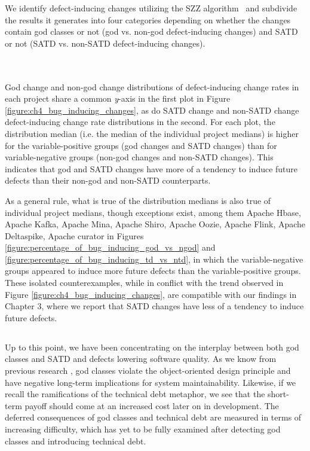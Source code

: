 We identify defect-inducing changes utilizing the SZZ algorithm~\cite{sliwerski-msr-2005} and subdivide the results it generates into four categories depending on whether the changes contain god classes or not (god vs. non-god defect-inducing changes) and SATD or not (SATD vs. non-SATD defect-inducing changes).\\ \\ \\



God change and non-god change distributions of defect-inducing change rates in each project share a common \textit{y}-axis in the first plot in Figure \ref{figure:ch4_bug_inducing_changes}, as do SATD change and non-SATD change defect-inducing change rate distributions in the second. For each plot, the distribution median (i.e. the median of the individual project medians) is higher for the variable-positive groups (god changes and SATD changes) than for variable-negative groups (non-god changes and non-SATD changes). This indicates that god and SATD changes have more of a tendency to induce future defects than their non-god and non-SATD counterparts.

As a general rule, what is true of the distribution medians is also true of individual project medians, though exceptions exist, among them Apache Hbase, Apache Kafka, Apache Mina, Apache Shiro, Apache Oozie, Apache Flink, Apache Deltaspike, Apache curator in Figures \ref{figure:percentage_of_bug_inducing_god_vs_ngod} and \ref{figure:percentage_of_bug_inducing_td_vs_ntd}, in which the variable-negative groups appeared to induce more future defects than the variable-positive groups. These isolated counterexamples, while in conflict with the trend observed in Figure \ref{figure:ch4_bug_inducing_changes}, are compatible with our findings in Chapter 3, where we report that SATD changes have less of a tendency to induce future defects.

\subsection*{\chapterIVrqIII}

Up to this point, we have been concentrating on the interplay between both god classes and SATD and defects lowering software quality. As we know from previous research \cite{marinescu2004detection}, god classes violate the object-oriented design principle and have negative long-term implications for system maintainability. Likewise, if we recall the ramifications of the technical debt metaphor, we see that the short-term payoff should come at an increased cost later on in development. The deferred consequences of god classes and technical debt are measured in terms of increasing difficulty, which has yet to be fully examined after detecting god classes and introducing technical debt.


